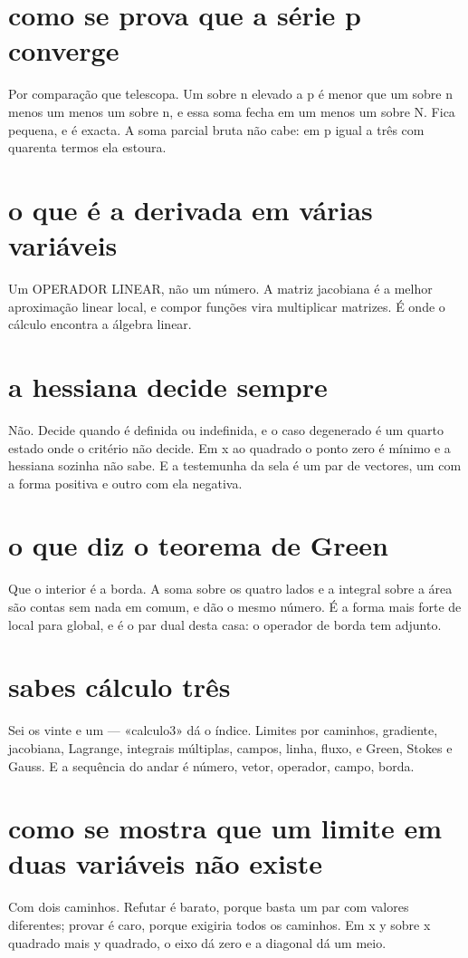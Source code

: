 \documentclass[11pt,a4paper]{article}
\begin{document}
\section{como se prova que a série p converge}
Por comparação que telescopa. Um sobre n elevado a p é menor que um sobre n menos um
menos um sobre n, e essa soma fecha em um menos um sobre N. Fica pequena, e é exacta. A
soma parcial bruta não cabe: em p igual a três com quarenta termos ela estoura.

\section{o que é a derivada em várias variáveis}
Um OPERADOR LINEAR, não um número. A matriz jacobiana é a melhor aproximação linear
local, e compor funções vira multiplicar matrizes. É onde o cálculo encontra a álgebra
linear.

\section{a hessiana decide sempre}
Não. Decide quando é definida ou indefinida, e o caso degenerado é um quarto estado onde
o critério não decide. Em x ao quadrado o ponto zero é mínimo e a hessiana sozinha não
sabe. E a testemunha da sela é um par de vectores, um com a forma positiva e outro com
ela negativa.

\section{o que diz o teorema de Green}
Que o interior é a borda. A soma sobre os quatro lados e a integral sobre a área são
contas sem nada em comum, e dão o mesmo número. É a forma mais forte de local para
global, e é o par dual desta casa: o operador de borda tem adjunto.

\section{sabes cálculo três}
Sei os vinte e um — «calculo3» dá o índice. Limites por caminhos, gradiente, jacobiana,
Lagrange, integrais múltiplas, campos, linha, fluxo, e Green, Stokes e Gauss. E a
sequência do andar é número, vetor, operador, campo, borda.

\section{como se mostra que um limite em duas variáveis não existe}
Com dois caminhos. Refutar é barato, porque basta um par com valores diferentes; provar
é caro, porque exigiria todos os caminhos. Em x y sobre x quadrado mais y quadrado, o
eixo dá zero e a diagonal dá um meio.
\end{document}
